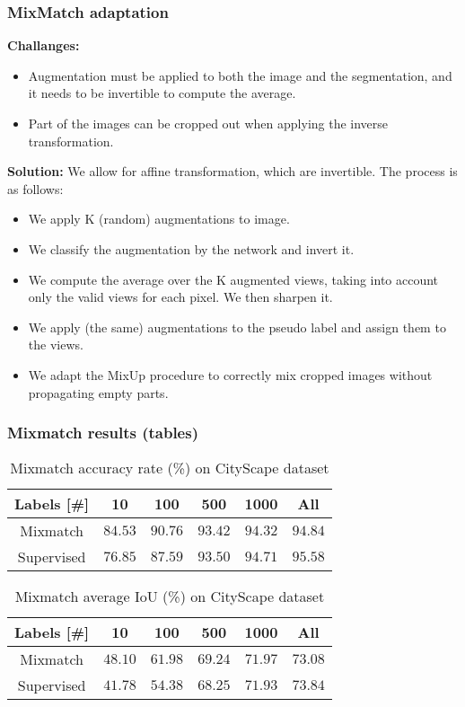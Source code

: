 \documentclass[aspectratio=169,11pt]{beamer}
\begin{document}
\begin{frame}
    \frametitle{MixMatch adaptation}
    \textbf{Challanges:}
    \begin{itemize}
        \item Augmentation must be applied to both the image and the segmentation, and it needs to be invertible to compute the average.
        \item Part of the images can be cropped out when applying the inverse transformation. 
    \end{itemize}

    \textbf{Solution:}
    We allow for affine transformation, which are invertible. The process is as follows:
    \begin{itemize}
        \item We apply K (random) augmentations to image.
        \item We classify the augmentation by the network and invert it.
        \item We compute the average over the K augmented views, taking into account only the valid views for each pixel. We then sharpen it.
        \item We apply (the same) augmentations to the pseudo label and assign them to the views. 
        \item We adapt the MixUp procedure to correctly mix cropped images without propagating empty parts.
    \end{itemize}
    

    
\end{frame}

\begin{frame}
    \frametitle{Mixmatch results (tables)}
    \begin{table}[tbh]
        \begin{tabular}{|c|c|c|c|c|c|}
        \hline
        Labels [\#]  & 10 & 100 & 500 & 1000 & All \\
        \hline
        Mixmatch & $84.53$ & $90.76$ & $93.42$ & $94.32$ & $94.84$ \\
        \hline
        Supervised & $76.85$ & $87.59$ & $93.50$ & $94.71$ & $95.58$ \\
        \hline
        \end{tabular}
        \caption{Mixmatch accuracy rate (\%) on CityScape dataset}
    \end{table}
    \begin{table}[tbh]
        \begin{tabular}{|c|c|c|c|c|c|}
        \hline
        Labels [\#]  & 10 & 100 & 500 & 1000 & All \\
        \hline
        Mixmatch & $48.10$ & $61.98$ & $69.24$ & $71.97$ & $73.08$ \\
        \hline
        Supervised & $41.78$ & $54.38$ & $68.25$ & $71.93$ & $73.84$ \\
        \hline
        \end{tabular}
        \caption{Mixmatch average IoU (\%) on CityScape dataset}
    \end{table}
\end{frame}
\end{document}
